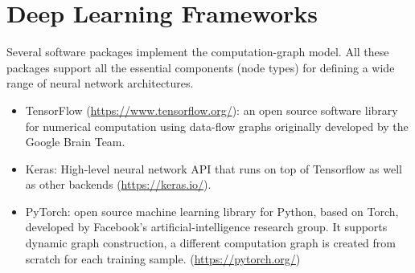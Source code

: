 \section{Deep Learning Frameworks}
Several software packages implement the computation-graph model. All these packages support all the essential components (node types) for defining a wide range of neural network architectures.
\begin{itemize}
\item TensorFlow (\url{https://www.tensorflow.org/}): an open source software library for numerical computation using data-flow graphs originally developed by the Google Brain Team. 

\item Keras: High-level neural network API that runs on top of Tensorflow as well as other backends (\url{https://keras.io/}). 

\item PyTorch: open source machine learning library for Python, based on Torch, developed by Facebook's artificial-intelligence research group. It supports dynamic graph construction, a different computation graph is created from scratch for each training sample. (\url{https://pytorch.org/})

\end{itemize}

